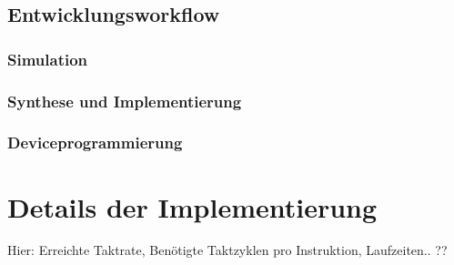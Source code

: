 \subsection{Entwicklungsworkflow}
\subsubsection{Simulation}
\subsubsection{Synthese und Implementierung}
\subsubsection{Deviceprogrammierung}


\section{Details der Implementierung}
Hier: Erreichte Taktrate, Benötigte Taktzyklen pro
Instruktion, Laufzeiten.. ??
